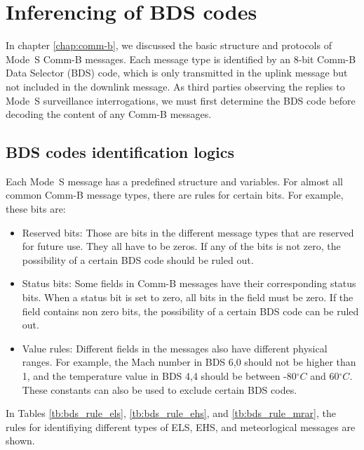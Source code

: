 \chapter{Inferencing of BDS codes}

In chapter \ref{chap:comm-b}, we discussed the basic structure and protocols of Mode~S Comm-B messages. Each message type is identified by an 8-bit Comm-B Data Selector (BDS) code, which is only transmitted in the uplink message but not included in the downlink message. As third parties observing the replies to Mode~S surveillance interrogations, we must first determine the BDS code before decoding the content of any Comm-B messages. 


\section{BDS codes identification logics}

Each Mode~S message has a predefined structure and variables. For almost all common Comm-B message types, there are rules for certain bits. For example, these bits are:
\begin{itemize}
    \item Reserved bits: Those are bits in the different message types that are reserved for future use. They all have to be zeros. If any of the bits is not zero, the possibility of a certain BDS code should be ruled out.
    \item Status bits: Some fields in Comm-B messages have their corresponding status bits. When a status bit is set to zero, all bits in the field must be zero. If the field contains non zero bits, the possibility of a certain BDS code can be ruled out.
    \item Value rules: Different fields in the messages also have different physical ranges. For example, the Mach number in BDS 6,0 should not be higher than 1, and the temperature value in BDS 4,4 should be between -80$^\circ C$ and 60$^\circ C$. These constants can also be used to exclude certain BDS codes.
\end{itemize}


In Tables \ref{tb:bds_rule_els}, \ref{tb:bds_rule_ehs}, and \ref{tb:bds_rule_mrar}, the rules for identifiying different types of ELS, EHS, and meteorlogical messages are shown.


